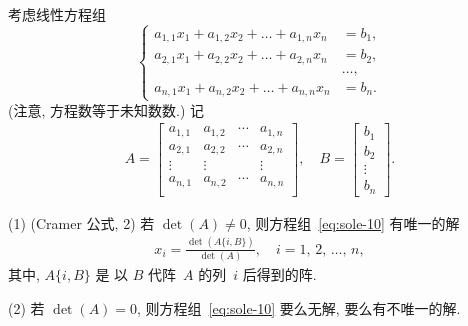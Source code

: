 \documentclass[../libro.tex]{subfiles}
\begin{document}
\begin{theorem}
    考虑线性方程组
    \begin{equation}
        \left\{ %
        \begin{aligned}
            a_{1,1} x_1 + a_{1,2} x_2 + \dots + a_{1,n} x_n & = b_1, \\
            a_{2,1} x_1 + a_{2,2} x_2 + \dots + a_{2,n} x_n & = b_2, \\
            & \dots, \\
            a_{n,1} x_1 + a_{n,2} x_2 + \dots + a_{n,n} x_n & = b_n.
        \end{aligned}
        \right. %
        \label{eq:sole-10}
    \end{equation}
    (注意, 方程数等于未知数数.)
    记
    \begin{align*}
        A =
        \begin{bmatrix}
            a_{1,1} & a_{1,2} & \cdots & a_{1,n} \\
            a_{2,1} & a_{2,2} & \cdots & a_{2,n} \\
            \vdots  & \vdots  & {}     & \vdots  \\
            a_{n,1} & a_{n,2} & \cdots & a_{n,n} \\
        \end{bmatrix},
        \quad
        B =
        \begin{bmatrix}
            b_1 \\ b_2 \\ \vdots \\ b_n
        \end{bmatrix}.
    \end{align*}

    (1)
    (Cramer 公式, 2)
    若 \(\det {(A)} \neq 0\),
    则方程组~\eqref{eq:sole-10} 有唯一的解
    \begin{align*}
        x_i = \frac{\det {(A \{i, B\})}}{\det {(A)}},
        \quad
        \text{\(i = 1\), \(2\), \(\dots\), \(n\)},
    \end{align*}
    其中, \(A \{i, B\}\) 是%
    以 \(B\) 代阵~\(A\) 的列~\(i\) 后得到的阵.

    (2)
    若 \(\det {(A)} = 0\),
    则方程组~\eqref{eq:sole-10} 要么无解,
    要么有不唯一的解.
\end{theorem}
\end{document}
